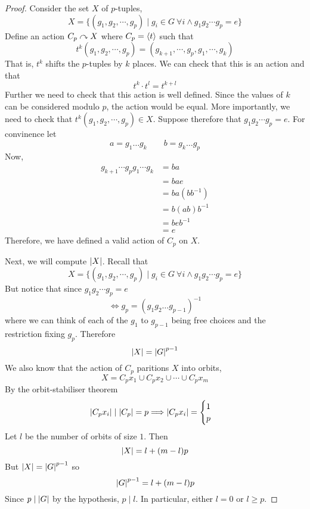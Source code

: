 \documentclass{article}
\begin{document}
\begin{proof}
    Consider the set $X$ of $p$-tuples,
    \[
        X = \{(g_1, g_2, \cdots, g_p) \mid g_i \in G \ \forall i \wedge g_1g_2\cdots g_p = e\}
    \]
    Define an action $C_p \curvearrowright X$ where $C_p = \left\langle t\right\rangle$ such that
    \[
        t^k (g_1, g_2, \cdots, g_p) = (g_{k+1}, \cdots, g_p, g_1, \cdots, g_{k})  
    \]
    That is, $t^k$ shifts the $p$-tuples by $k$ places. We can check that this is an action and that
    \[
        t^k \cdot t^l = t^{k + l} 
    \]
    Further we need to check that this action is well defined. Since the values of $k$ can be considered modulo $p$, the action would be equal. More importantly, we need to check that $t^k(g_1, g_2, \cdots, g_p) \in X$.
    Suppose therefore that $g_1g_2\cdots g_p = e$. For convinence let
    \[
        a = g_1\ldots g_k \qquad b = g_k\ldots g_p
    \]
    Now, 
    \begin{align*}
        g_{k+1}\cdots g_{p} g_1 \cdots g_k &= ba \\
        &= bae \\
        &= ba(b b^{-1}) \\
        &= b (ab) b^{-1} \\
        &= b e b^{-1} \\
        &= e
    \end{align*}
    Therefore, we have defined a valid action of $C_p$ on $X$.

    Next, we will compute $\left\lvert X\right\rvert$. Recall that
    \[
        X = \{(g_1, g_2, \cdots, g_p) \mid g_i \in G \ \forall i \wedge g_1g_2\cdots g_p = e\}
    \]
    But notice that since $g_1g_2\cdots g_p = e$
    \[
        \Leftrightarrow g_p = (g_1 g_2 \ldots g_{p-1})^{-1}    
    \]
    where we can think of each of the $g_1$ to $g_{p-1}$ being free choices and the restriction fixing $g_p$. Therefore
    \[
        \left\lvert X\right\rvert = \left\lvert G\right\rvert^{p-1}  
    \]
    We also know that the action of $C_p$ paritions $X$ into orbits,
    \[
        X = C_px_1 \cup C_px_2 \cup \cdots \cup C_px_m
    \]
    By the orbit-stabiliser theorem
    \[
        \left\lvert C_px_i\right\rvert \mid \left\lvert C_p\right\rvert = p \Longrightarrow \left\lvert C_px_i\right\rvert = \begin{cases}
            1 \\ 
            p
        \end{cases}
    \]
    Let $l$ be the number of orbits of size $1$. Then
    \[
        \left\lvert X\right\rvert = l + (m-l)p
    \]
    But $\left\lvert X\right\rvert = \left\lvert G\right\rvert^{p-1}$ so
    \[
        \left\lvert G\right\rvert^{p-1} = l + (m-l)p
    \]
    Since $p \mid \left\lvert G\right\rvert$ by the hypothesis, $p \mid l$. In particular, either $l = 0$ or $l \geq p$.


\end{proof}
\end{document}
